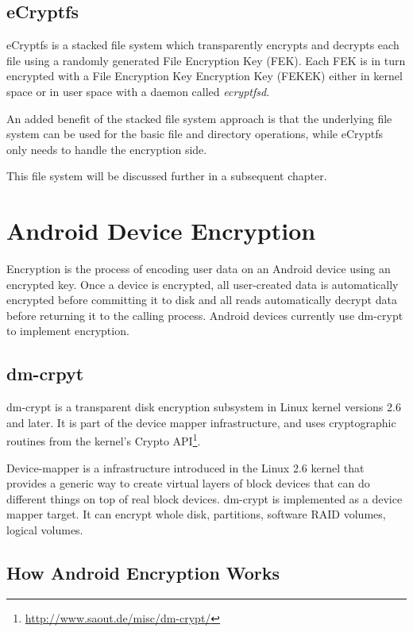\subsection{eCryptfs}
\label{sub-sec:sa-ecryptfs}

eCryptfs is a stacked file system which transparently encrypts and decrypts each file using a randomly generated File Encryption Key (FEK). Each FEK is in turn encrypted with a File Encryption Key Encryption Key (FEKEK) either in kernel space or in user space with a daemon called \textit{ecryptfsd}.

An added benefit of the stacked file system approach is that the underlying file system can be used for the basic file and directory operations, while eCryptfs only needs to handle the encryption side.

This file system will be discussed further in a subsequent chapter.

\section{Android Device Encryption}
\label{sec:and-dev-enc}

Encryption is the process of encoding user data on an Android device using an encrypted key. Once a device is encrypted, all user-created data is automatically encrypted before committing it to disk and all reads automatically decrypt data before returning it to the calling process.
Android devices currently use dm-crypt to implement encryption.

\subsection{dm-crpyt}
\label{sub-sec:dm-crypt}

dm-crypt is a transparent disk encryption subsystem in Linux kernel versions 2.6 and later. It is part of the device mapper infrastructure, and uses cryptographic routines from the kernel's Crypto API\footnote{\url{http://www.saout.de/misc/dm-crypt/}}.

Device-mapper is a infrastructure introduced in the Linux 2.6 kernel that provides a generic way to create virtual layers of block devices that can do different things on top of real block devices.
dm-crypt is implemented as a device mapper target. It can encrypt whole disk, partitions, software RAID volumes, logical volumes.

\subsection{How Android Encryption Works}
\label{sub-sec:and-enc-works}

